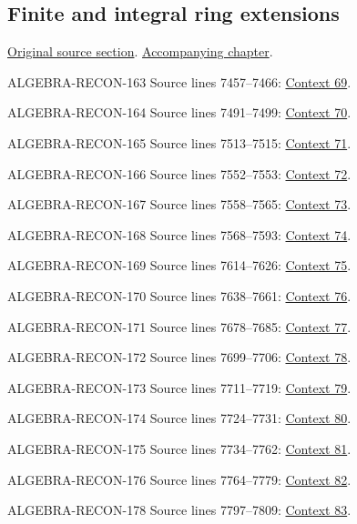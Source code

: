 \subsection{Finite and integral ring extensions}
\hypertarget{algebra-source-section-finite-ring-extensions}{}
\noindent\href{https://github.com/stacks/stacks-project/blob/a04446e57ec1fbc252a871afcec7752fb2807b14/algebra.tex\#L7434}{Original source section}. \href{algebra.pdf\#nameddest=section-finite-ring-extensions}{Accompanying chapter}.

\begin{AlgebraSourceRoutes}
\item[ALGEBRA-RECON-163] Source lines 7457--7466: \hyperlink{algebra-context-069}{Context 69}.
\item[ALGEBRA-RECON-164] Source lines 7491--7499: \hyperlink{algebra-context-070}{Context 70}.
\item[ALGEBRA-RECON-165] Source lines 7513--7515: \hyperlink{algebra-context-071}{Context 71}.
\item[ALGEBRA-RECON-166] Source lines 7552--7553: \hyperlink{algebra-context-072}{Context 72}.
\item[ALGEBRA-RECON-167] Source lines 7558--7565: \hyperlink{algebra-context-073}{Context 73}.
\item[ALGEBRA-RECON-168] Source lines 7568--7593: \hyperlink{algebra-context-074}{Context 74}.
\item[ALGEBRA-RECON-169] Source lines 7614--7626: \hyperlink{algebra-context-075}{Context 75}.
\item[ALGEBRA-RECON-170] Source lines 7638--7661: \hyperlink{algebra-context-076}{Context 76}.
\item[ALGEBRA-RECON-171] Source lines 7678--7685: \hyperlink{algebra-context-077}{Context 77}.
\item[ALGEBRA-RECON-172] Source lines 7699--7706: \hyperlink{algebra-context-078}{Context 78}.
\item[ALGEBRA-RECON-173] Source lines 7711--7719: \hyperlink{algebra-context-079}{Context 79}.
\item[ALGEBRA-RECON-174] Source lines 7724--7731: \hyperlink{algebra-context-080}{Context 80}.
\item[ALGEBRA-RECON-175] Source lines 7734--7762: \hyperlink{algebra-context-081}{Context 81}.
\item[ALGEBRA-RECON-176] Source lines 7764--7779: \hyperlink{algebra-context-082}{Context 82}.
\item[ALGEBRA-RECON-178] Source lines 7797--7809: \hyperlink{algebra-context-083}{Context 83}.

\end{AlgebraSourceRoutes}
